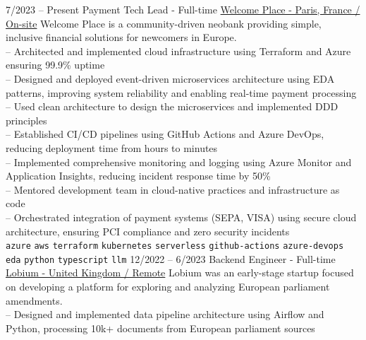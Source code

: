 \vspace{0.2cm}


\begin{entrylist}
    \entry
    {7/2023 -- Present}
    {Payment Tech Lead - Full-time}
    {
        \href{https://www.linkedin.com/company/welcome-place/}{Welcome Place - Paris, France / On-site}}
    {
        Welcome Place is a community-driven neobank providing simple, inclusive financial solutions for newcomers in Europe. \\

        -- Architected and implemented cloud infrastructure using Terraform and Azure ensuring 99.9\% uptime \\
        -- Designed and deployed event-driven microservices architecture using EDA patterns, improving system reliability and enabling real-time payment processing \\
        -- Used clean architecture to design the microservices and implemented DDD principles \\
        -- Established CI/CD pipelines using GitHub Actions and Azure DevOps, reducing deployment time from hours to minutes \\
        -- Implemented comprehensive monitoring and logging using Azure Monitor and Application Insights, reducing incident response time by 50\% \\
        -- Mentored development team in cloud-native practices and infrastructure as code \\
        -- Orchestrated integration of payment systems (SEPA, VISA) using secure cloud architecture, ensuring PCI compliance and zero security incidents \\
        \texttt{azure}\slashsep
        \texttt{aws}\slashsep
        \texttt{terraform}\slashsep
        \texttt{kubernetes}\slashsep
        \texttt{serverless}\slashsep
        \texttt{github-actions}\slashsep
        \texttt{azure-devops}\slashsep
        \texttt{eda}\slashsep
        \texttt{python}\slashsep
        \texttt{typescript}\slashsep
        \texttt{llm}\slashsep
    }
    \entry
    {12/2022 -- 6/2023}
    {Backend Engineer - Full-time}
    {
        \href{https://www.linkedin.com/company/lobium/}{Lobium - United Kingdom / Remote}}
    {
        Lobium was an early-stage startup focused on developing a platform for exploring and analyzing European parliament amendments. \\
        -- Designed and implemented data pipeline architecture using Airflow and Python, processing 10k+ documents from European parliament sources \\
}
\end{entrylist}
